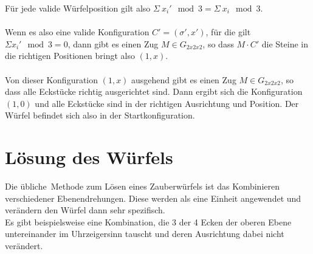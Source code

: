 \documentclass[12pt,a4paper, usenames, dvipsnames]{article}
\begin{document}
Für jede valide Würfelposition gilt also ${\Sigma \ x_i' \mod 3 = \Sigma \  x_i \mod 3 }$. \\
\\
Wenn es also eine valide Konfiguration $C'=(\sigma', x')$, für die gilt $\Sigma x_i' \mod 3 = 0$, dann gibt es einen Zug $M \in G_{2x2x2}$, so dass $M \cdot C'$ die Steine in die richtigen Positionen bringt also $(1,x)$. \\
\\
Von dieser Konfiguration $(1,x)$ ausgehend gibt es einen Zug $M \in G_{2x2x2}$, so dass alle Eckstücke richtig ausgerichtet sind. Dann ergibt sich die Konfiguration $(1, 0)$ und alle Eckstücke sind in der richtigen Ausrichtung und Position. Der Würfel befindet sich also in der Startkonfiguration. \\ 























\newpage


\section{Lösung des Würfels}

Die \glqq übliche\grqq \  Methode zum Lösen eines Zauberwürfels ist das Kombinieren verschiedener Ebenendrehungen. Diese werden als eine Einheit angewendet und verändern den Würfel dann sehr spezifisch. \\
Es gibt beispielsweise eine Kombination, die 3 der 4 Ecken der oberen Ebene untereinander im Uhrzeigersinn tauscht und deren Ausrichtung dabei nicht verändert. \\
\\














\end{document}
